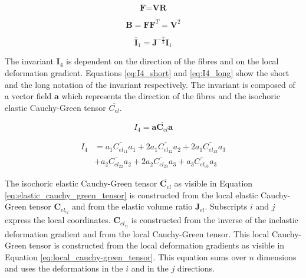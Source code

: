 \begin{equation}
    \textbf{F} = \textbf{V} \textbf{R} 
    \label{eq:F}
\end{equation}

\begin{equation}
    \textbf{B} = \textbf{F} \textbf{F}^T = \textbf{V}^2
    \label{eq:B}
\end{equation}

\begin{equation}
    \overline{\textbf{I}}_{1} = \textbf{J}^{- \frac{2}{3}} \textbf{I}_{1}
    \label{eq:invariant_incompressible_mat}
\end{equation}

\qquad The invariant $\textbf{I}_4$ is dependent on the direction of the fibres and on the local deformation gradient. Equations \ref{eq:I4_short} and \ref{eq:I4_long} show the short and the long notation of the invariant respectively. The invariant is composed of a vector field $\textbf{a}$ which represents the direction of the fibres and the isochoric elastic Cauchy-Green tensor $\overline{C_{el}}$.

\begin{equation}
    I_{4} = \textbf{a} \overline{\textbf{C}_{el}} \textbf{a}
    \label{eq:I4_short}
\end{equation}
  
\begin{equation}\label{eq:I4_long}
  \begin{split}
       I_{4} & = a_{1} \overline{C_{el_{11}}} a_{1} 
            + 2a_{1} \overline{C_{el_{12}}} a_{2}
            + 2 a_{1} \overline{C_{el_{13}}} a_{3}\\
            & + a_{2} \overline{C_{el_{22}}} a_{2}
            + 2 a_{2} \overline{C_{el_{23}}} a_{3}
            + a_{3} \overline{C_{el_{33}}} a_{3}
        \end{split}
 \end{equation}
 
 \qquad The isochoric elastic Cauchy-Green tensor $\overline{\textbf{C}_{el}}$ as visible in Equation \ref{eq:elastic_cauchy_green_tensor} is constructed from the local elastic Cauchy-Green tensor $\textbf{C}_{el_{ij}}$ and from the elastic volume ratio $\textbf{J}_{el}$. Subscripts $i$ and $j$ express the local coordinates. $\textbf{C}_{el_{ij}}$ is constructed from the inverse of the inelastic deformation gradient and from the local Cauchy-Green tensor. This local Cauchy-Green tensor is constructed from the local deformation gradients as visible in Equation \ref{eq:local_cauchy-green_tensor}. This equation sums over $n$ dimensions and uses the deformations in the $i$ and in the $j$ directions.

